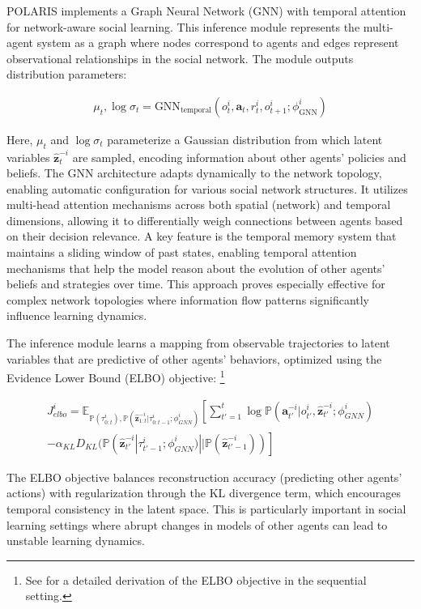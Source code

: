\documentclass[a4paper,12pt]{report}
\begin{document}
POLARIS implements a Graph Neural Network (GNN) with temporal attention for network-aware social learning. This inference module represents the multi-agent system as a graph where nodes correspond to agents and edges represent observational relationships in the social network. The module outputs distribution parameters:

\begin{align}
    \mu_t, \log\sigma_t = \text{GNN}_{\text{temporal}}(o^i_t, \boldsymbol{a}_t, r^i_t, o^i_{t+1}; \phi^i_{\text{GNN}})
\end{align}

Here, $\mu_t$ and $\log\sigma_t$ parameterize a Gaussian distribution from which latent variables $\boldsymbol{\hat{z}}^{-i}_t$ are sampled, encoding information about other agents' policies and beliefs. The GNN architecture adapts dynamically to the network topology, enabling automatic configuration for various social network structures. It utilizes multi-head attention mechanisms across both spatial (network) and temporal dimensions, allowing it to differentially weigh connections between agents based on their decision relevance. A key feature is the temporal memory system that maintains a sliding window of past states, enabling temporal attention mechanisms that help the model reason about the evolution of other agents' beliefs and strategies over time. This approach proves especially effective for complex network topologies where information flow patterns significantly influence learning dynamics.

The inference module learns a mapping from observable trajectories to latent variables that are predictive of other agents' behaviors, optimized using the Evidence Lower Bound (ELBO) objective: \footnote{See \cite{kim2022influencing} for a detailed derivation of the ELBO objective in the sequential setting.}

\begin{align}
    J^i_{elbo} = \mathbb{E}_{\mathbb{P}(\tau^i_{0:t}),\mathbb{P}(\boldsymbol{\hat{z}}^{-i}_{1:t}|\tau^i_{0:t-1};\phi^i_{GNN})}\left[ \sum_{t'=1}^t \log \mathbb{P}(\boldsymbol{a}^{-i}_{t'}|o^i_{t'}, \boldsymbol{\hat{z}}^{-i}_{t'}; \phi^i_{GNN}) \right. \\
        \left. - \alpha_{KL} D_{KL}(\mathbb{P}(\boldsymbol{\hat{z}}^{-i}_{t'}|\tau^i_{t'-1}; \phi^i_{GNN})||\mathbb{P}(\boldsymbol{\hat{z}}^{-i}_{t'-1}))\right]
\end{align}

The ELBO objective balances reconstruction accuracy (predicting other agents' actions) with regularization through the KL divergence term, which encourages temporal consistency in the latent space. This is particularly important in social learning settings where abrupt changes in models of other agents can lead to unstable learning dynamics.
\end{document}
